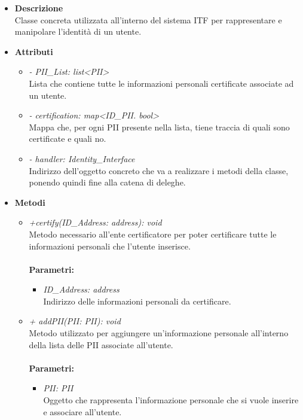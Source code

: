 \begin{itemize}
	\item \textbf{Descrizione}\\
	Classe concreta utilizzata all'interno del sistema \gls{ITF} per rappresentare e manipolare l'identità di un utente.
	\item \textbf{Attributi}
	\begin{itemize}
		\item \textit{- PII\_List: list<PII>}\\
		Lista che contiene tutte le informazioni personali certificate associate ad un utente.
		\item \textit{- certification: map<ID\_PII. bool>}\\
		Mappa che, per ogni \gls{PII} presente nella lista, tiene traccia di quali sono certificate e quali no.
		\item \textit{- handler: Identity\_Interface}\\
		Indirizzo dell'oggetto concreto che va a realizzare i metodi della classe, ponendo quindi fine alla catena di deleghe.
	\end{itemize}
	\item \textbf{Metodi}
	\begin{itemize}
		\item \textit{+certify(ID\_Address: address): void}\\
		Metodo necessario all'ente certificatore per poter certificare tutte le informazioni personali che l'utente inserisce.\\\\
		\textbf{Parametri:}
		\begin{itemize}
			\item \textit{ID\_Address: address}\\
			Indirizzo delle informazioni personali da certificare.
		\end{itemize}
		\item \textit{+ addPII(PII: PII): void}\\
		Metodo utilizzato per aggiungere un'informazione personale all'interno della lista delle \gls{PII} associate all'utente.\\\\
		\textbf{Parametri:}
		\begin{itemize}
			\item \textit{PII: PII}\\
			Oggetto che rappresenta l'informazione personale che si vuole inserire e associare all'utente.
		\end{itemize}

\end{itemize}
\end{itemize}

